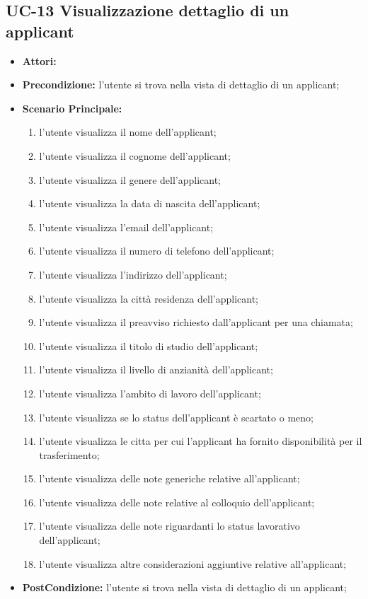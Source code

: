 \subsection{UC-13 Visualizzazione dettaglio di un applicant }
\begin{itemize}
\item \textbf{Attori:} \loggedusr
\item \textbf{Precondizione:}  l'utente si trova nella vista di dettaglio di un applicant;
\item \textbf{Scenario Principale:}
\begin{enumerate}
	\item l'utente visualizza il nome dell'applicant;
	\item l'utente visualizza il cognome dell'applicant;
	\item l'utente visualizza il genere dell'applicant;
	\item l'utente visualizza la data di nascita dell'applicant;
	\item l'utente visualizza l'email dell'applicant;
	\item l'utente visualizza il numero di telefono dell'applicant;	
	\item l'utente visualizza l'indirizzo dell'applicant;
	\item l'utente visualizza la città residenza dell'applicant;
	\item l'utente visualizza il preavviso richiesto dall'applicant per una chiamata;
	\item l'utente visualizza il titolo di studio dell'applicant;
	\item l'utente visualizza il livello di anzianità dell'applicant;
	\item l'utente visualizza l'ambito di lavoro dell'applicant;
	\item l'utente visualizza se lo status dell'applicant è scartato o meno;
	
	\item l'utente visualizza le citta per cui l'applicant ha fornito disponibilità per il trasferimento;
	\item l'utente visualizza delle note generiche relative all'applicant;
	\item l'utente visualizza delle note relative al colloquio dell'applicant;
	\item l'utente visualizza delle note riguardanti lo status lavorativo dell'applicant;
	\item l'utente visualizza altre considerazioni aggiuntive relative all'applicant;
\end{enumerate}
\item \textbf{PostCondizione:}  l'utente si trova nella vista di dettaglio di un applicant;
\end{itemize}


